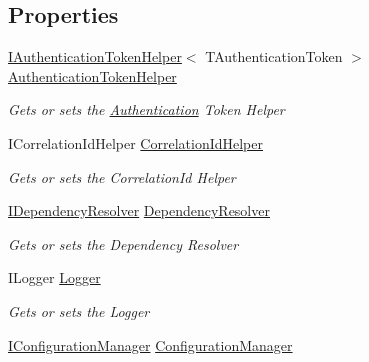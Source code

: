 \subsection*{Properties}
\begin{DoxyCompactItemize}
\item 
\hyperlink{interfaceCqrs_1_1Authentication_1_1IAuthenticationTokenHelper}{I\+Authentication\+Token\+Helper}$<$ T\+Authentication\+Token $>$ \hyperlink{classCqrs_1_1Bus_1_1InProcessBus_a20d068b944183ab04e77c3164d19a860}{Authentication\+Token\+Helper}
\begin{DoxyCompactList}\small\item\em Gets or sets the \hyperlink{namespaceCqrs_1_1Authentication}{Authentication} Token Helper \end{DoxyCompactList}\item 
I\+Correlation\+Id\+Helper \hyperlink{classCqrs_1_1Bus_1_1InProcessBus_a3ab05953af552331928ca0f1131c269d}{Correlation\+Id\+Helper}
\begin{DoxyCompactList}\small\item\em Gets or sets the Correlation\+Id Helper \end{DoxyCompactList}\item 
\hyperlink{interfaceCqrs_1_1Configuration_1_1IDependencyResolver}{I\+Dependency\+Resolver} \hyperlink{classCqrs_1_1Bus_1_1InProcessBus_a2eafea26a2848880fdbf84717b8e60e1}{Dependency\+Resolver}
\begin{DoxyCompactList}\small\item\em Gets or sets the Dependency Resolver \end{DoxyCompactList}\item 
I\+Logger \hyperlink{classCqrs_1_1Bus_1_1InProcessBus_a6d20e32f64b6dfce12852083f0c641c8}{Logger}
\begin{DoxyCompactList}\small\item\em Gets or sets the Logger \end{DoxyCompactList}\item 
\hyperlink{interfaceCqrs_1_1Configuration_1_1IConfigurationManager}{I\+Configuration\+Manager} \hyperlink{classCqrs_1_1Bus_1_1InProcessBus_a403133ecfdbdfa85090366f1d5f95230}{Configuration\+Manager}

\end{DoxyCompactItemize}
